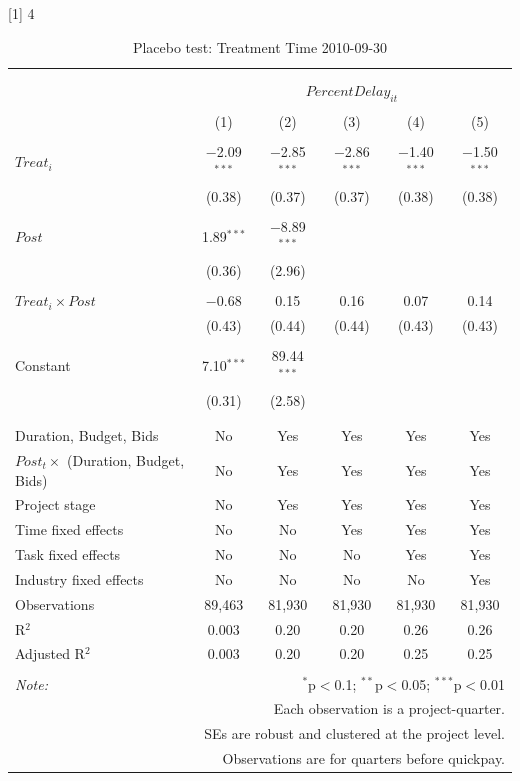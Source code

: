 \documentclass[
]{article}
\begin{document}
{[}1{]} 4

\begin{table}[H] \centering 
  \caption{Placebo test: Treatment Time 2010-09-30} 
  \label{} 
\small 
\begin{tabular}{@{\extracolsep{-2pt}}lccccc} 
\\[-1.8ex]\hline 
\hline \\[-1.8ex] 
\\[-1.8ex] & \multicolumn{5}{c}{$PercentDelay_{it}$} \\ 
\\[-1.8ex] & (1) & (2) & (3) & (4) & (5)\\ 
\hline \\[-1.8ex] 
 $Treat_i$ & $-$2.09$^{***}$ & $-$2.85$^{***}$ & $-$2.86$^{***}$ & $-$1.40$^{***}$ & $-$1.50$^{***}$ \\ 
  & (0.38) & (0.37) & (0.37) & (0.38) & (0.38) \\ 
  & & & & & \\ 
 $Post$ & 1.89$^{***}$ & $-$8.89$^{***}$ &  &  &  \\ 
  & (0.36) & (2.96) &  &  &  \\ 
  & & & & & \\ 
 $Treat_i \times Post$ & $-$0.68 & 0.15 & 0.16 & 0.07 & 0.14 \\ 
  & (0.43) & (0.44) & (0.44) & (0.43) & (0.43) \\ 
  & & & & & \\ 
 Constant & 7.10$^{***}$ & 89.44$^{***}$ &  &  &  \\ 
  & (0.31) & (2.58) &  &  &  \\ 
  & & & & & \\ 
\hline \\[-1.8ex] 
Duration, Budget, Bids & No & Yes & Yes & Yes & Yes \\ 
$Post_t \times$  (Duration, Budget, Bids) & No & Yes & Yes & Yes & Yes \\ 
Project stage & No & Yes & Yes & Yes & Yes \\ 
Time fixed effects & No & No & Yes & Yes & Yes \\ 
Task fixed effects & No & No & No & Yes & Yes \\ 
Industry fixed effects & No & No & No & No & Yes \\ 
Observations & 89,463 & 81,930 & 81,930 & 81,930 & 81,930 \\ 
R$^{2}$ & 0.003 & 0.20 & 0.20 & 0.26 & 0.26 \\ 
Adjusted R$^{2}$ & 0.003 & 0.20 & 0.20 & 0.25 & 0.25 \\ 
\hline 
\hline \\[-1.8ex] 
\textit{Note:}  & \multicolumn{5}{r}{$^{*}$p$<$0.1; $^{**}$p$<$0.05; $^{***}$p$<$0.01} \\ 
 & \multicolumn{5}{r}{Each observation is a project-quarter.} \\ 
 & \multicolumn{5}{r}{SEs are robust and clustered at the project level.} \\ 
 & \multicolumn{5}{r}{Observations are for quarters before quickpay.} \\ 
\end{tabular} 
\end{table}
\end{document}
